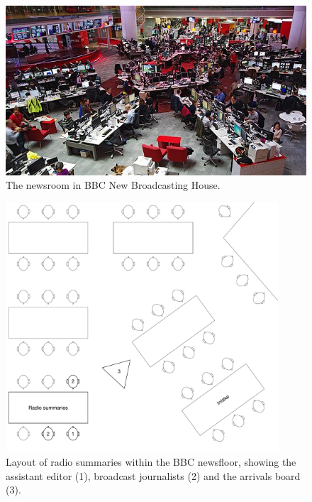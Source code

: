 \begin{figure}[p]
  \centering
  \includegraphics[width=\columnwidth]{figs/newsroom.jpg}
  \caption{The newsroom in BBC New Broadcasting House.}
  \label{fig:newsroom}
\end{figure}

\begin{figure}[p]
	\centering
	\includegraphics[width=4in]{figs/news-layout.pdf}
  \caption{Layout of radio summaries within the BBC newsfloor, showing the assistant editor (1), broadcast journalists
  (2) and the arrivals board (3).}
	\label{fig:newsroom-layout}
\end{figure}

